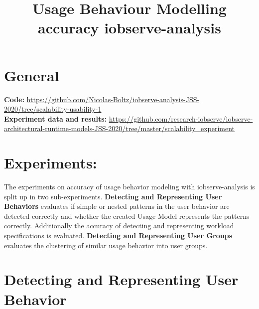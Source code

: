 \documentclass[10pt,a4paper]{article}
\begin{document}
\title{Usage Behaviour Modelling\\accuracy iobserve-analysis}
\date{}
\maketitle

	\section{General}
	\textbf{Code:} \url{https://github.com/Nicolas-Boltz/iobserve-analysis-JSS-2020/tree/scalability-usability-1}\\
	\textbf{Experiment data and results:} \url{https://github.com/research-iobserve/iobserve-architectural-runtime-models-JSS-2020/tree/master/scalability_experiment}
	
	\section{Experiments:}
	The experiments on accuracy of usage behavior modeling with iobserve-analysis is split up in two sub-experiments. \textbf{Detecting and Representing User Behaviors} evaluates if simple or nested patterns in the user behavior are detected correctly and whether the created Usage Model represents the patterns correctly. Additionally the accuracy of detecting and representing workload specifications is evaluated. \textbf{Detecting and Representing User Groups} evaluates the clustering of similar usage behavior into user groups.

	\section{Detecting and Representing User Behavior}
\end{document}
